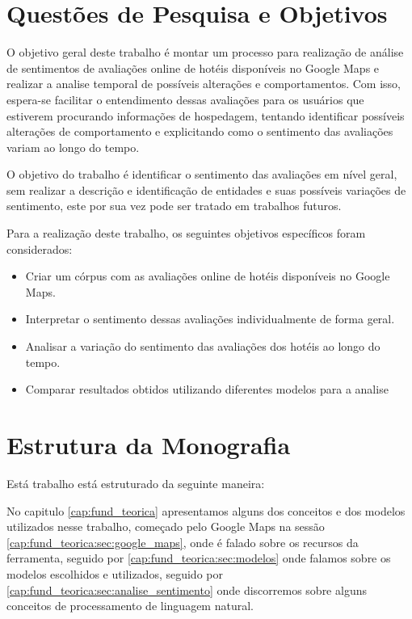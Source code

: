 \section{Questões de Pesquisa e Objetivos}


O objetivo geral deste trabalho é montar um processo para realização de análise de sentimentos de avaliações online de hotéis disponíveis no Google Maps e realizar a analise temporal de possíveis alterações e comportamentos. Com isso, espera-se facilitar o entendimento dessas avaliações para os usuários que estiverem procurando informações de hospedagem, tentando identificar possíveis alterações de comportamento e explicitando como o sentimento das avaliações variam ao longo do tempo.

O objetivo do trabalho é identificar o sentimento das avaliações em nível geral, sem realizar a descrição e identificação de entidades e suas possíveis variações de sentimento, este por sua vez pode ser tratado em trabalhos futuros.

Para a realização deste trabalho, os seguintes objetivos específicos foram considerados:

\begin{itemize}
	\item Criar um córpus com as avaliações online de hotéis disponíveis no Google Maps.
	\item Interpretar o sentimento dessas avaliações individualmente de forma geral.
	\item Analisar a variação do sentimento das avaliações dos hotéis ao longo do tempo.
	\item Comparar resultados obtidos utilizando diferentes modelos para a analise
\end{itemize}


\section{Estrutura da Monografia}

Está trabalho está estruturado da seguinte maneira: 

No capitulo \ref{cap:fund_teorica} apresentamos alguns dos conceitos e dos modelos utilizados nesse trabalho, começado pelo Google Maps na sessão \ref{cap:fund_teorica:sec:google_maps}, onde é falado sobre os recursos da ferramenta, seguido por \ref{cap:fund_teorica:sec:modelos} onde falamos sobre os modelos escolhidos e utilizados, seguido por \ref{cap:fund_teorica:sec:analise_sentimento} onde discorremos sobre alguns conceitos de processamento de linguagem natural.

